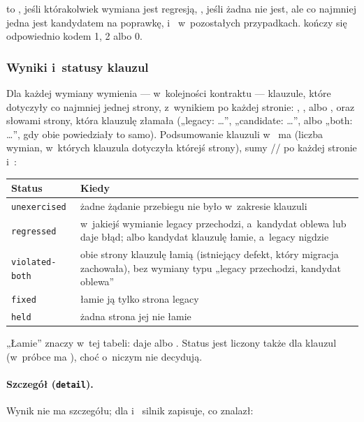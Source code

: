  to , jeśli którakolwiek wymiana jest regresją,
, jeśli żadna nie jest, ale co najmniej jedna jest kandydatem na poprawkę, i~ w~pozostałych przypadkach.  kończy się odpowiednio kodem
1, 2 albo 0.

\subsubsection{Wyniki i~statusy klauzul}

Dla każdej wymiany  wymienia --- w~kolejności kontraktu ---
klauzule, które dotyczyły co najmniej jednej strony, z~wynikiem po każdej stronie:
, ,  albo , oraz
 słowami strony, która klauzulę złamała („legacy: …”, „candidate: …”, albo
„both: …”, gdy obie powiedziały to samo). Podsumowanie klauzuli w~ ma
 (liczba wymian, w~których klauzula dotyczyła którejś strony), sumy
// po każdej stronie i~:

{\small
\begin{tabularx}{\linewidth}{@{}l >{\raggedright\arraybackslash}X@{}}
\toprule
Status & Kiedy \\
\midrule
\texttt{unexercised} & żadne żądanie przebiegu nie było w~zakresie klauzuli \\
\texttt{regressed} & w~jakiejś wymianie legacy przechodzi, a~kandydat oblewa lub daje błąd;
albo kandydat klauzulę łamie, a~legacy nigdzie \\
\texttt{violated-both} & obie strony klauzulę łamią (istniejący defekt, który migracja
zachowała), bez wymiany typu „legacy przechodzi, kandydat oblewa” \\
\texttt{fixed} & łamie ją tylko strona legacy \\
\texttt{held} & żadna strona jej nie łamie \\
\bottomrule
\end{tabularx}
}

„Łamie” znaczy w~tej tabeli: daje  albo . Status jest liczony
także dla klauzul  (w~próbce  ma
), choć o~niczym nie decydują.

\paragraph{Szczegół (\texttt{detail}).} Wynik  nie ma szczegółu; dla
 i~ silnik zapisuje, co znalazł:

